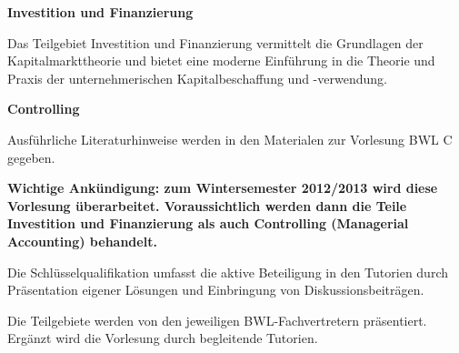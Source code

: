 \begin{course}
\begin{content}
\textbf{Investition und Finanzierung}

 

Das Teilgebiet Investition und Finanzierung vermittelt die Grundlagen der Kapitalmarkttheorie und bietet eine moderne Einführung in die Theorie und Praxis der unternehmerischen Kapitalbeschaffung und -verwendung.

 

\textbf{Controlling}


\end{content}



\begin{literature}Ausführliche Literaturhinweise werden in den Materialen zur Vorlesung BWL C gegeben.

\end{literature}

\begin{remarks}\textbf{\textbf{Wichtige Ankündigung: zum Wintersemester 2012/2013 wird diese Vorlesung überarbeitet. Voraussichtlich werden dann die Teile Investition und Finanzierung als auch Controlling (Managerial Accounting) behandelt.}}

 

Die Schlüsselqualifikation umfasst die aktive Beteiligung in den Tutorien durch Präsentation eigener Lösungen und Einbringung von Diskussionsbeiträgen.

 

Die Teilgebiete werden von den jeweiligen BWL-Fachvertretern präsentiert. Ergänzt wird die Vorlesung durch begleitende Tutorien.

\end{remarks}

\end{course}